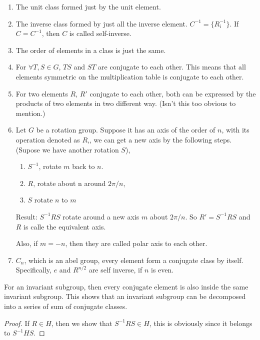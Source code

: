 \begin{fact}$ $

    \begin{enumerate}
        \item The unit class formed just by the unit element.
        \item The inverse class formed by just all the inverse element.
            $C^{-1} = \{ R_i^{-1}\}$. If $C=C^{-1}$, then $C$ is called
            self-inverse.
        \item The order of elements in a class is just the same.
        \item For $\forall T,S\in G$, $TS$ and $ST$ are conjugate to each
            other. This means that all elements symmetric on the
            multiplication table is conjugate to each other.
        \item For two elements $R$, $R'$ conjugate to each other, both
            can be expressed by the products of two elements in two
            different way. (Isn't this too obvious to mention.)
        \item Let $G$ be a rotation group. Suppose it has an axis of the
            order of $n$, with its operation denoted as $R$,, we can get
            a new axis by the following steps. (Supose we have another
            rotation $S$),

            \begin{enumerate}
                \item  $S^{-1}$, rotate $m$ back to $n$.
                \item  $R$, rotate about n around $2\pi/n$,
                \item  $S$ rotate $n$ to $m$
            \end{enumerate}

            Result: $S^{-1}RS$ rotate around a new axis $m$ about
            $2\pi/n$. So $R'=S^{-1}RS$ and $R$ is calle the equivalent
            axis. 
            
            Also, if $m=-n$, then they are called polar axis to each
            other.

        \item $C_n$, which is an abel group, every element form a
            conjugate class by itself. Specifically, $e$ and $R^{n/2}$
            are self inverse, if $n$ is even.
    \end{enumerate}
\end{fact}
\begin{prop}
    \label{prop:20161010.conjugate_subgroup}
    For an invariant subgroup, then every conjugate element is also
    inside the same invariant subgroup. This shows that an invariant
    subgroup can be decomposed into a series of sum of conjugate classes.
\end{prop}
\begin{proof}
    If $R\in H$, then we show that $S^{-1}RS\in H$, this is obviously
    since it belongs to $S^{-1}HS$.
\end{proof}

